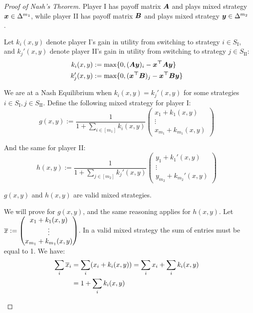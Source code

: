 \begin{proof}[Proof of Nash's Theorem]
	Player I has payoff matrix $\bm{A}$ and plays mixed strategy
	$\bm{x} \in \Delta^{m_1}$, while player II has payoff matrix
	$\bm{B}$ and plays mixed strategy $\bm{y} \in \Delta^{m_2}$.

	Let $k_i(x,y)$ denote player I's gain in utility from switching to
	strategy $i \in S_\text{I}$, and $k_j'(x,y)$ denote player II's gain in
	utility from switching to strategy $j \in S_\text{II}$:
	\begin{equation}
		\begin{split}
			k_i(x,y) & := \max \{ 0, (\bm{Ay})_i - \bm{x^\top A y} \} \\
			k_j'(x,y) & := \max \{ 0, (\bm{x^\top B})_j - \bm{x^\top B y} \} \\
		\end{split}
	\end{equation}

	We are at a Nash Equilibrium when $k_i(x,y) = k_j'(x,y)$ for some
	strategies $i \in S_\text{I}, j \in S_\text{II}$. Define the following
	mixed strategy for player I:
	\begin{equation}
		g(x,y) := \frac{1}{1 + \sum_{i \in [m_1]} k_i(x,y)} \begin{pmatrix}
			x_1 + k_1(x,y) \\
			\vdots \\
			x_{m_1} + k_{m_1}(x,y)
		\end{pmatrix}
	\end{equation}

	And the same for player II:
	\begin{equation}
		h(x,y) := \frac{1}{1 + \sum_{j \in [m_2]} k_j'(x,y)} \begin{pmatrix}
			y_1 + k_1'(x,y) \\
			\vdots \\
			y_{m_2} + k_{m_2}'(x,y)
		\end{pmatrix}
	\end{equation}

	\begin{claim*}
		$g(x,y)$ and $h(x,y)$ are valid mixed strategies.
	\end{claim*}
	\begin{subproof}
		We will prove for $g(x,y)$, and the same reasoning applies for
		$h(x,y)$.  Let $\overline{x} := \begin{pmatrix}
			x_1 + k_1(x,y) \\
			\vdots \\
			x_{m_1} + k_{m_1}(x,y) \\
		\end{pmatrix}$. In a valid mixed strategy the sum of entries must
		be equal to 1. We have:
		\begin{equation*}
			\begin{split}
				\sum_i \overline{x}_i & = \sum_i (x_i + k_i(x,y)) = \sum_i x_i +
				\sum_i k_i(x,y) \\
				& = 1 + \sum_i k_i(x,y)
			\end{split}
		\end{equation*}


\end{subproof}
\end{proof}
